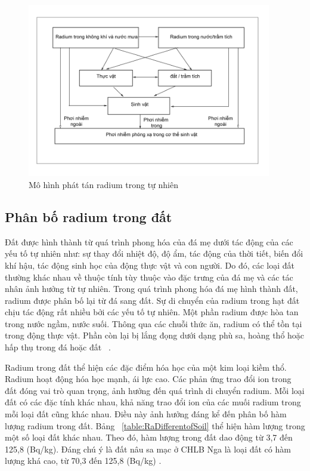\begin{figure}[htbp]
    \centering
    \includegraphics[width=0.95\textwidth]{Image/RadiumInBiota.png}
    \caption{Mô hình phát tán radium trong tự nhiên ~\cite{IAEANo476:revise}}
    \label{figure:RadiumToBiota}
\end{figure}


   \subsection{Phân bố radium trong đất}

   Đất được hình thành từ quá trình phong hóa của đá mẹ dưới tác động của các yếu tố tự nhiên như: sự thay đổi nhiệt độ, độ ẩm, tác động của thời tiết, biến đổi khí hậu, tác động sinh học của động thực vật và con người. Do đó, các loại đất thường khác nhau về thuộc tính tùy thuộc vào đặc trưng của đá mẹ và các tác nhân ảnh hưởng từ tự nhiên. Trong quá trình phong hóa đá mẹ hình thành đất, radium được phân bố lại từ đá sang đất. Sự di chuyển của radium trong hạt đất chịu tác động rất nhiều bởi các yếu tố tự nhiên. Một phần radium được hòa tan trong nước ngầm, nước suối. Thông qua các chuỗi thức ăn, radium có thể tồn tại trong động thực vật. Phần còn lại bị lắng đọng dưới dạng phù sa, hoàng thổ hoặc hấp thụ trong đá hoặc đất ~\cite{IAEANo310:revise}. 

   Radium trong đất thể hiện các đặc điểm hóa học của một kim loại kiềm thổ. Radium hoạt động hóa học mạnh, ái lực cao. Các phản ứng trao đổi ion trong đất đóng vai trò quan trọng, ảnh hưởng đến quá trình di chuyển radium. Mỗi loại đất có các đặc tính khác nhau, khả năng trao đổi ion của các muối radium trong mỗi loại đất cũng khác nhau. Điều này ảnh hưởng đáng kể đến phân bố hàm lượng radium trong đất. Bảng ~\ref{table:RaDifferentofSoil} thể hiện hàm lượng  trong một số loại đất khác nhau. Theo đó, hàm lượng  trong đất dao động từ 3,7 đến 125,8 (Bq/kg). Đáng chú ý là đất nâu sa mạc ở CHLB Nga là loại đất có hàm lượng  khá cao, từ 70,3 đến 125,8 (Bq/kg) \cite{IAEANo310:revise}.   
   
